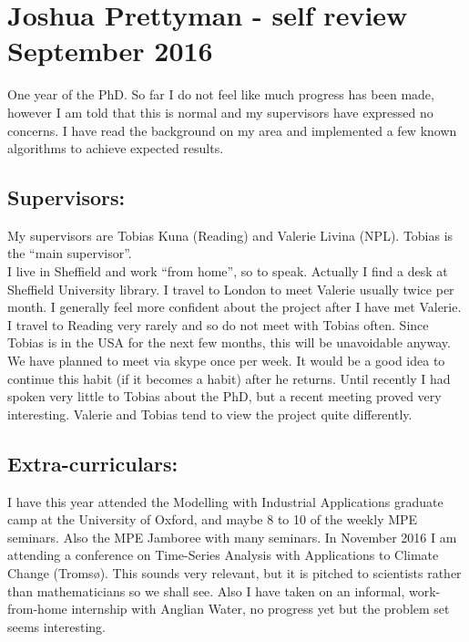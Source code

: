 \documentclass[11pt,a4paper,reqno]{article}
\numberwithin{equation}{section}
\begin{document}


\lstset{language=Python}


\section*{Joshua Prettyman - self review September 2016}

One year of the PhD. So far I do not feel like much progress has been made, however I am told that this is normal and my supervisors have expressed no concerns. I have read the background on my area and implemented a few known algorithms to achieve expected results. \\

\subsection*{Supervisors:}

My supervisors are Tobias Kuna (Reading) and Valerie Livina (NPL). Tobias is the ``main supervisor''.\\

I live in Sheffield and work ``from home'', so to speak. Actually I find a desk at Sheffield University library. I travel to London to meet Valerie usually twice per month. I generally feel more confident about the project after I have met Valerie. I travel to Reading very rarely and so do not meet with Tobias often. Since Tobias is in the USA for the next few months, this will be unavoidable anyway. We have planned to meet via skype once per week. It would be a good idea to continue this habit (if it becomes a habit) after he returns. Until recently I had spoken very little to Tobias about the PhD, but a recent meeting proved very interesting. Valerie and Tobias tend to view the project quite differently.\\

\subsection*{Extra-curriculars:}

I have this year attended the Modelling with Industrial Applications graduate camp at the University of Oxford, and maybe 8 to 10 of the weekly MPE seminars. Also the MPE Jamboree with many seminars. In November 2016 I am attending a conference on Time-Series Analysis with Applications to Climate Change (Troms{\o}). This sounds very relevant, but it is pitched to scientists rather than mathematicians so we shall see. Also I have taken on an informal, work-from-home internship with Anglian Water, no progress yet but the problem set seems interesting. \\
\end{document}
